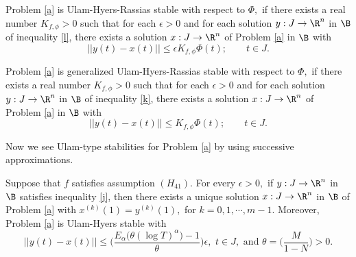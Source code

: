 \begin{defn}
Problem \eqref{a} is Ulam-Hyers-Rassias stable with respect to $\Phi,$ if there exists a real number $K_{f,\phi}>0$ such that for each $\epsilon>0$ and for each solution $y:{J}\to{\R}^{n}$ in $\B$ of inequality \eqref{l}, there exists a solution $x:{J}\to{{\R}^{n}}$ of Problem \eqref{a} in $\B$ with
\begin{equation*}
||y(t)-x(t)||\leq\epsilon K_{f,\phi}\Phi(t);\qquad t\in{J}.
\end{equation*}
\end{defn}
\begin{defn}
Problem \eqref{a} is generalized Ulam-Hyers-Rassias stable with respect to $\Phi,$ if there exists a real number $K_{f,\phi}>0$ such that for each $\epsilon>0$ and for each solution $y:{J}\to{\R}^{n}$ in $\B$ of inequality \eqref{k}, there exists a solution $x:{J}\to{\R}^{n}$ of Problem \eqref{a} in $\B$ with
\begin{equation*}
||y(t)-x(t)||\leq K_{f,\phi}\Phi(t);\qquad t\in{J}.
\end{equation*}
\end{defn}
Now we see Ulam-type stabilities for Problem \eqref{a} by using successive approximations.
\begin{theorem}\label{th2}
Suppose that $f$ satisfies assumption ${(H_{41})}$. For every $\epsilon>0,$ if $y:{J}\to{\R}^{n}$ in $\B$ satisfies inequality \eqref{j}, then there exists a unique solution $x:{J}\to{\R}^{n}$ in $\B$ of Problem \eqref{a} with $x^{(k)}(1)=y^{(k)}(1),$ for $k=0,1,\cdots,m-1.$ Moreover, Problem \eqref{a} is Ulam-Hyers stable with
\begin{equation*}
||y(t)-x(t)||\leq\bigg(\frac{E_{\alpha}\big(\theta(\log{T})^{\alpha}\big)-1}{\theta}\bigg)\epsilon,\,\, t\in{J},\,\,\text{and}\,\, \theta=\big(\frac{M}{1-N}\big)>0.
\end{equation*}
\end{theorem}
